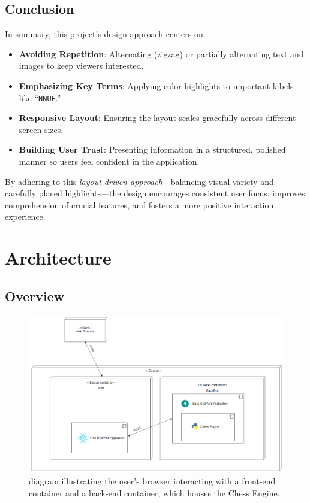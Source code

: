 \documentclass[12pt,a4paper]{article}
\begin{document}
\subsection{Conclusion}
In summary, this project’s design approach centers on:
\begin{itemize}
    \item \textbf{Avoiding Repetition}: Alternating (zigzag) 
    or partially alternating text and images to keep viewers interested.
    \item \textbf{Emphasizing Key Terms}: Applying color highlights to 
    important labels like “\texttt{NNUE}.”
    \item \textbf{Responsive Layout}: Ensuring the layout scales gracefully 
    across different screen sizes.
    \item \textbf{Building User Trust}: Presenting information 
    in a structured, polished manner so users feel confident 
    in the application.
\end{itemize}

By adhering to this \emph{layout-driven approach}—balancing 
visual variety and carefully placed highlights—the design 
encourages consistent user focus, improves comprehension 
of crucial features, and fosters a more positive interaction experience.



\section{Architecture}
\label{sec:architecture}
\subsection{Overview}
\begin{figure}[H]
    \centering
    \includegraphics[width=1\textwidth]{figures/diagram1.png}  %
    \caption{diagram illustrating the user’s browser interacting with 
    a front-end container and a back-end container, which houses the Chess Engine.}
    \label{fig:system-architecture}
\end{figure}
\end{document}
